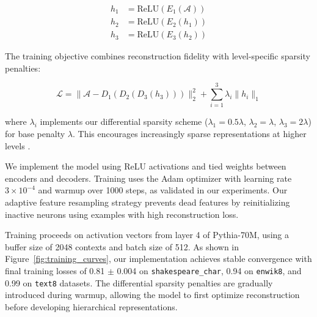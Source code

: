 \begin{align}
h_1 &= \text{ReLU}(E_1(\mathcal{A})) \\
h_2 &= \text{ReLU}(E_2(h_1)) \\
h_3 &= \text{ReLU}(E_3(h_2))
\end{align}

The training objective combines reconstruction fidelity with level-specific sparsity penalties:

\begin{equation}
\mathcal{L} = \|\mathcal{A} - D_1(D_2(D_3(h_3)))\|_2^2 + \sum_{i=1}^3 \lambda_i\|h_i\|_1
\end{equation}

where $\lambda_i$ implements our differential sparsity scheme ($\lambda_1 = 0.5\lambda$, $\lambda_2 = \lambda$, $\lambda_3 = 2\lambda$) for base penalty $\lambda$. This encourages increasingly sparse representations at higher levels \cite{elhage2022solu}.

We implement the model using ReLU activations and tied weights between encoders and decoders. Training uses the Adam optimizer with learning rate $3 \times 10^{-4}$ and warmup over 1000 steps, as validated in our experiments. Our adaptive feature resampling strategy prevents dead features by reinitializing inactive neurons using examples with high reconstruction loss.

Training proceeds on activation vectors from layer 4 of Pythia-70M, using a buffer size of 2048 contexts and batch size of 512. As shown in Figure~\ref{fig:training_curves}, our implementation achieves stable convergence with final training losses of 0.81 $\pm$ 0.004 on \texttt{shakespeare\_char}, 0.94 on \texttt{enwik8}, and 0.99 on \texttt{text8} datasets. The differential sparsity penalties are gradually introduced during warmup, allowing the model to first optimize reconstruction before developing hierarchical representations.

